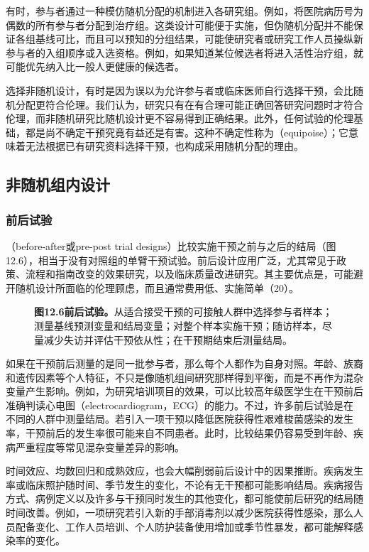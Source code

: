 有时，参与者通过一种模仿随机分配的机制进入各研究组。例如，将医院病历号为偶数的所有参与者分配到治疗组。这类设计可能便于实施，但伪随机分配并不能保证各组基线可比，而且可以预知的分组结果，可能使研究者或研究工作人员操纵新参与者的入组顺序或入选资格。例如，如果知道某位候选者将进入活性治疗组，就可能优先纳入比一般人更健康的候选者。

选择非随机设计，有时是因为误以为允许参与者或临床医师自行选择干预，会比随机分配更符合伦理。我们认为，研究只有在有合理可能正确回答研究问题时才符合伦理，而非随机研究比随机设计更不容易得到正确结果。此外，任何试验的伦理基础，都是尚不确定干预究竟有益还是有害。这种不确定性称为（equipoise）；它意味着无法根据已有研究资料选择干预，也构成采用随机分配的理由。

\subsection{非随机组内设计}
\subsubsection{前后试验}
（before-after或pre-post trial designs）比较实施干预之前与之后的结局（图12.6），相当于没有对照组的单臂干预试验。前后设计应用广泛，尤其常见于政策、流程和指南改变的效果研究，以及临床质量改进研究。其主要优点是，可能避开随机设计所面临的伦理顾虑，而且通常费用低、实施简单（20）。
\begin{figure}[htbp]\centering\chTwelveBefore
\caption*{\textbf{图12.6\quad 前后试验。}从适合接受干预的可接触人群中选择参与者样本；测量基线预测变量和结局变量；对整个样本实施干预；随访样本，尽量减少失访并评估干预依从性；在干预期结束后测量结局。}
\end{figure}

如果在干预前后测量的是同一批参与者，那么每个人都作为自身对照。年龄、族裔和遗传因素等个人特征，不只是像随机组间研究那样得到平衡，而是不再作为混杂变量产生影响。例如，为研究培训项目的效果，可以比较高年级医学生在干预前后准确判读心电图（electrocardiogram，ECG）的能力。不过，许多前后试验是在不同的人群中测量结局。若引入一项干预以降低医院获得性艰难梭菌感染的发生率，干预前后的发生率很可能来自不同患者。此时，比较结果仍容易受到年龄、疾病严重程度等常见混杂变量差异的影响。

时间效应、均数回归和成熟效应，也会大幅削弱前后设计中的因果推断。疾病发生率或临床照护随时间、季节发生的变化，不论有无干预都可能影响结局。疾病报告方式、病例定义以及许多与干预同时发生的其他变化，都可能使前后研究的结局随时间改善。例如，一项研究若引入新的手部消毒剂以减少医院获得性感染，那么人员配备变化、工作人员培训、个人防护装备使用增加或季节性暴发，都可能解释感染率的变化。

